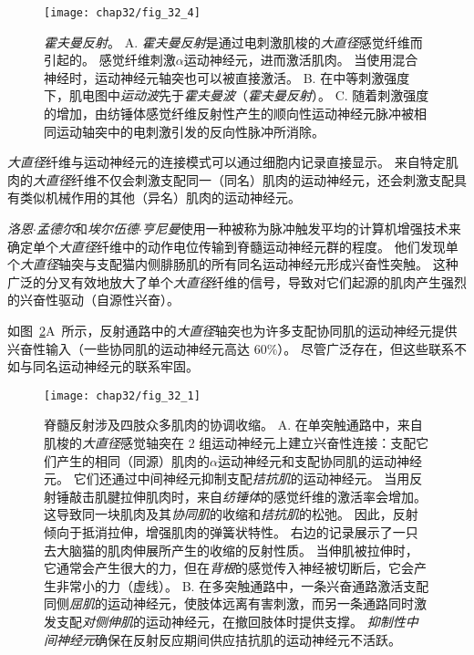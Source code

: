 \begin{figure}[htbp]
	\centering
	\texttt{[image: chap32/fig\_32\_4]}
	\caption{\textit{霍夫曼反射}。
		A. \textit{霍夫曼反射}是通过电刺激肌梭的\textit{大直径}感觉纤维而引起的。
		感觉纤维刺激$\alpha$运动神经元，进而激活肌肉。
		当使用混合神经时，运动神经元轴突也可以被直接激活。
		B. 在中等刺激强度下，肌电图中\textit{运动波}先于\textit{霍夫曼波}（\textit{霍夫曼反射}）。
		C. 随着刺激强度的增加，由纺锤体感觉纤维反射性产生的顺向性运动神经元脉冲被相同运动轴突中的电刺激引发的反向性脉冲所消除。}
	\label{fig:32_4}
\end{figure}


\textit{大直径}纤维与运动神经元的连接模式可以通过细胞内记录直接显示。
来自特定肌肉的\textit{大直径}纤维不仅会刺激支配同一（同名）肌肉的运动神经元，还会刺激支配具有类似机械作用的其他（异名）肌肉的运动神经元。


\textit{洛恩$\cdot$孟德尔}和\textit{埃尔伍德$\cdot$亨尼曼}使用一种被称为脉冲触发平均的计算机增强技术来确定单个\textit{大直径}纤维中的动作电位传输到脊髓运动神经元群的程度。
他们发现单个\textit{大直径}轴突与支配猫内侧腓肠肌的所有同名运动神经元形成兴奋性突触。
这种广泛的分叉有效地放大了单个\textit{大直径}纤维的信号，导致对它们起源的肌肉产生强烈的兴奋性驱动（自源性兴奋）。


如图~\ref{fig:32_1}A~所示，反射通路中的\textit{大直径}轴突也为许多支配协同肌的运动神经元提供兴奋性输入（一些协同肌的运动神经元高达 60\%）。 
尽管广泛存在，但这些联系不如与同名运动神经元的联系牢固。


\begin{figure}[htbp]
	\centering
	\texttt{[image: chap32/fig\_32\_1]}
	\caption{脊髓反射涉及四肢众多肌肉的协调收缩。
		A. 在单突触通路中，来自肌梭的\textit{大直径}感觉轴突在 2 组运动神经元上建立兴奋性连接：支配它们产生的相同（同源）肌肉的$ \alpha $运动神经元和支配协同肌的运动神经元。
		它们还通过中间神经元抑制支配\textit{拮抗肌}的运动神经元。
		当用反射锤敲击肌腱拉伸肌肉时，来自\textit{纺锤体}的感觉纤维的激活率会增加。
		这导致同一块肌肉及其\textit{协同肌}的收缩和\textit{拮抗肌}的松弛。
		因此，反射倾向于抵消拉伸，增强肌肉的弹簧状特性。
		右边的记录展示了一只去大脑猫的肌肉伸展所产生的收缩的反射性质。
		当伸肌被拉伸时，它通常会产生很大的力，但在\textit{背根}的感觉传入神经被切断后，它会产生非常小的力（虚线）\cite{liddell1924reflexes}。
		B. 在多突触通路中，一条兴奋通路激活支配同侧\textit{屈肌}的运动神经元，使肢体远离有害刺激，而另一条通路同时激发支配\textit{对侧伸肌}的运动神经元，在撤回肢体时提供支撑。
		\textit{抑制性中间神经元}确保在反射反应期间供应拮抗肌的运动神经元不活跃\cite{schmidt1989motor}。}
	\label{fig:32_1}
\end{figure}


